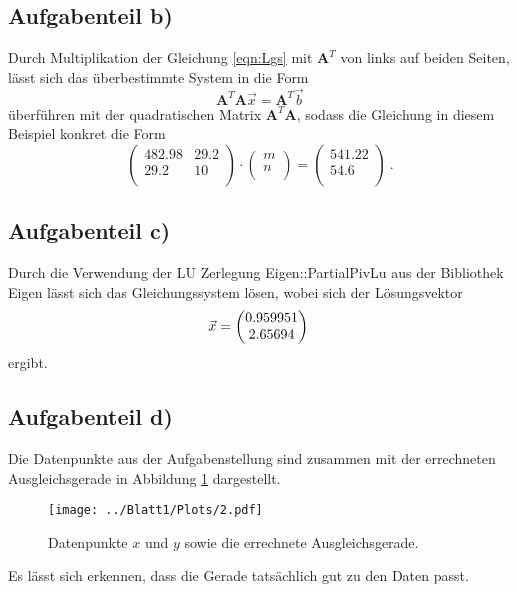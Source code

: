 \subsection*{Aufgabenteil b)}
Durch Multiplikation der Gleichung \eqref{eqn:Lgs} mit $\symbf{A}^{T}$ von links auf beiden Seiten, lässt sich das überbestimmte System in die Form
\begin{equation}
  \symbf{A}^{T}\symbf{A}\vec{x}=\symbf{A}^{T}\vec{b}
  \label{eqn:lgs2}
\end{equation}
überführen mit der quadratischen Matrix $\symbf{A}^{T}\symbf{A}$, sodass die Gleichung in diesem Beispiel konkret die Form
\begin{equation}
  \begin{pmatrix}
    482.98 & 29.2 \\
    29.2 & 10 \\
  \end{pmatrix}
  \cdot
  \begin{pmatrix}
    m \\
    n \\
  \end{pmatrix}
  =
  \begin{pmatrix}
    541.22 \\
    54.6 \\
  \end{pmatrix} \: .
\end{equation}

\subsection*{Aufgabenteil c)}
Durch die Verwendung der LU Zerlegung Eigen::PartialPivLu aus der Bibliothek Eigen lässt sich das Gleichungssystem lösen, wobei sich der Lösungsvektor
\begin{equation*}
  \vec{x}=
  \begin{pmatrix}
    0.959951\\
    2.65694\\
  \end{pmatrix} \\
\end{equation*}
ergibt.
\subsection*{Aufgabenteil d)}
Die Datenpunkte aus der Aufgabenstellung sind zusammen mit der errechneten Ausgleichsgerade in Abbildung \ref{fig:gerade} dargestellt.
\begin{figure}[H]
  \centering
  \texttt{[image: ../Blatt1/Plots/2.pdf]}
  \caption{Datenpunkte $x$ und $y$ sowie die errechnete Ausgleichsgerade.}
  \label{fig:gerade}
\end{figure}
Es lässt sich erkennen, dass die Gerade tatsächlich gut zu den Daten passt.


